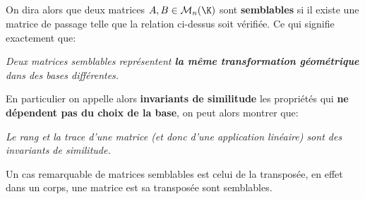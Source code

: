 \pagebreak

\subsection*{}

On dira alors que deux matrices \(A, B \in \mathcal{M}_n(\K)\) sont \textbf{semblables} si il existe une matrice de passage telle que la relation ci-dessus soit vérifiée.
Ce qui signifie exactement que:
\begin{center}
   \textit{Deux matrices semblables représentent \textbf{la même transformation géométrique} dans des bases différentes.}
\end{center}
En particulier on appelle alors \textbf{invariants de similitude} les propriétés qui \textbf{ne dépendent pas du choix de la base}, on peut alors montrer que:
\begin{center}
   \textit{Le rang et la trace d'une matrice (et donc d'une application linéaire) sont des invariants de similitude.}
\end{center}
Un cas remarquable de matrices semblables est celui de la transposée, en effet dans un corps, une matrice est sa transposée sont semblables.

\subsection*{}

